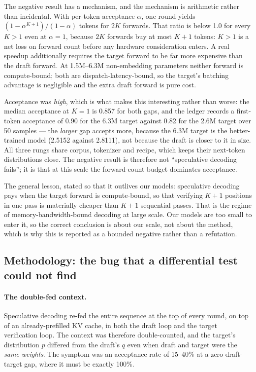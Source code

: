 \documentclass[11pt,a4paper]{article}
\begin{document}
The negative result has a mechanism, and the mechanism is arithmetic rather
than incidental. With per-token acceptance $\alpha$, one round yields
$(1 - \alpha^{K+1}) / (1 - \alpha)$ tokens for $2K$ forwards. That ratio is
below 1.0 for every $K > 1$ even at $\alpha = 1$, because $2K$ forwards buy at
most $K+1$ tokens: $K > 1$ is a net loss on forward count before any hardware
consideration enters. A real speedup additionally requires the target forward
to be far more expensive than the draft forward. At 1.5M--6.3M
non-embedding parameters neither forward is compute-bound; both are
dispatch-latency-bound, so the target's batching advantage is negligible and
the extra draft forward is pure cost.

Acceptance was \emph{high}, which is what makes this interesting rather than
worse: the median acceptance at $K = 1$ is 0.857 for both gaps, and the ledger
records a first-token acceptance of 0.90 for the 6.3M target against 0.82 for
the 2.6M target over 50 samples --- the \emph{larger} gap accepts more, because
the 6.3M target is the better-trained model (2.5152 against 2.8111), not
because the draft is closer to it in size. All three rungs share corpus,
tokenizer and recipe, which keeps their next-token distributions close. %
 The
negative result is therefore not ``speculative decoding fails''; it is that at
this scale the forward-count budget dominates acceptance.

The general lesson, stated so that it outlives our models: speculative
decoding pays when the target forward is compute-bound, so that verifying $K+1$
positions in one pass is materially cheaper than $K+1$ sequential passes. That
is the regime of memory-bandwidth-bound decoding at large scale. Our models are
too small to enter it, so the correct conclusion is about our scale, not about
the method, which is why this is reported as a bounded negative rather than a
refutation.

\subsection{Methodology: the bug that a differential test could not find}
\label{sec:act5-methodology}

\paragraph{The double-fed context.} Speculative decoding re-fed the entire
sequence at the top of every round, on top of an already-prefilled KV cache, in
both the draft loop and the target verification loop. The context was therefore
double-counted, and the target's distribution $p$ differed from the draft's
$q$ even when draft and target were the \emph{same weights}. The symptom was
an acceptance rate of 15--40\% at a zero draft-target gap, where it must be
exactly 100\%.
\end{document}
